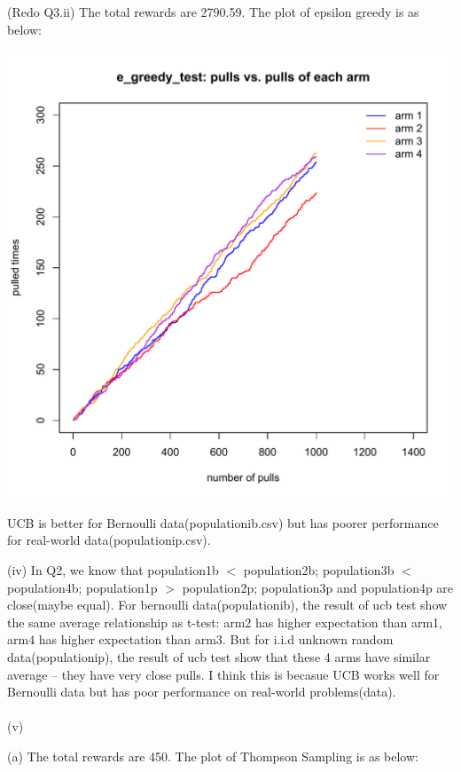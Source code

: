 \documentclass{article}
\begin{document}
\par
\quad (Redo Q3.ii) The total rewards are 2790.59. The plot of epsilon greedy is as below: \par
\includegraphics[width=1.0\textwidth]{Q3_3_2.pdf} 
\par
UCB is better for Bernoulli data(populationib.csv) but has poorer performance for real-world data(populationip.csv). 
\par
(iv)
\quad In Q2, we know that population1b $<$ population2b; population3b $<$ population4b; population1p $>$ population2p; population3p and population4p are close(maybe equal). For bernoulli data(populationib), the result of ucb test show the same average relationship as t-test: arm2 has higher expectation than arm1, arm4 has higher expectation than arm3. But for i.i.d unknown random data(populationip), the result of ucb test show that these 4 arms have similar average -- they have very close pulls. I think this is becasue UCB works well for Bernoulli data but has poor performance on real-world problems(data). 
\\\\
(v)
\par
\quad (a) The total rewards are 450. The plot of Thompson Sampling is as below: \par
\end{document}
